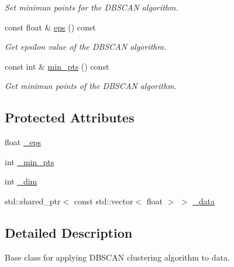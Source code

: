 \begin{DoxyCompactItemize}
\begin{DoxyCompactList}\small\item\em Set minimun points for the D\+B\+S\+C\+A\+N algorithm. \end{DoxyCompactList}\item 
\hypertarget{classcluster_1_1dbscan_a16f0b7f5ffa65a6638df01554559ba29}{}const float \& \hyperlink{classcluster_1_1dbscan_a16f0b7f5ffa65a6638df01554559ba29}{eps} () const \label{classcluster_1_1dbscan_a16f0b7f5ffa65a6638df01554559ba29}

\begin{DoxyCompactList}\small\item\em Get epsilon value of the D\+B\+S\+C\+A\+N algorithm. \end{DoxyCompactList}\item 
\hypertarget{classcluster_1_1dbscan_a099428308e3dd233ad0098bf85fdbb7b}{}const int \& \hyperlink{classcluster_1_1dbscan_a099428308e3dd233ad0098bf85fdbb7b}{min\+\_\+pts} () const \label{classcluster_1_1dbscan_a099428308e3dd233ad0098bf85fdbb7b}

\begin{DoxyCompactList}\small\item\em Get minimun points of the D\+B\+S\+C\+A\+N algorithm. \end{DoxyCompactList}\end{DoxyCompactItemize}
\subsection*{Protected Attributes}
\begin{DoxyCompactItemize}
\item 
float \hyperlink{classcluster_1_1dbscan_a623eaf58c70c4b8af054d421addb33af}{\+\_\+eps}
\item 
int \hyperlink{classcluster_1_1dbscan_aaf6a0241678a63592356ab8e150ee511}{\+\_\+min\+\_\+pts}
\item 
int \hyperlink{classcluster_1_1dbscan_af11131046370eccd7ff4538f328106bb}{\+\_\+dim}
\item 
std\+::shared\+\_\+ptr$<$ const std\+::vector$<$ float $>$ $>$ \hyperlink{classcluster_1_1dbscan_a606f2ffd2a43d393f3d8c8a41d4280a7}{\+\_\+data}
\end{DoxyCompactItemize}


\subsection{Detailed Description}
Base class for applying D\+B\+S\+C\+A\+N clustering algorithm to data. 

